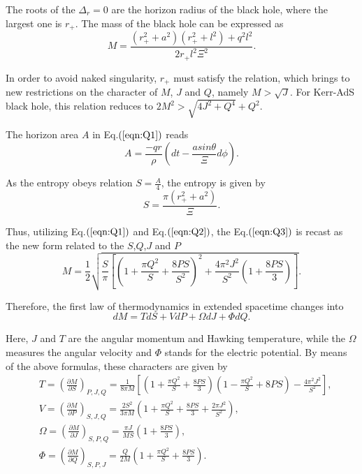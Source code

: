\documentclass[aps,preprint]{revtex4}%
\begin{document}
The roots of the $\Delta_{r}=0$ are the horizon radius of the black hole, where the largest one is $r_{+}$. The mass of the black hole can be expressed as
\begin{equation}\label{eqn:Q3}
M=\frac{(r_{+}^{2}+a^{2})(r_{+}^{2}+l^{2})+q^{2}l^{2}}{2r_{+}l^{2}\Xi^{2}}.
\end{equation}

 In order to avoid naked singularity, $r_{+}$ must satisfy the relation, which brings to new restrictions on the character of $M$, $J$ and $Q$, namely $M>\sqrt{J}$.
For Kerr-AdS black hole, this relation reduces to $2M^{2}>\sqrt{4J^{2}+Q^{4}}+Q^{2}$.

The horizon area $A$ in Eq.$\left(\ref{eqn:Q1}\right)$ reads
\begin{equation}\label{eqn:Q4}
A=\frac{-qr}{\rho}(dt-\frac{asin\theta}{\Xi}d\phi).
\end{equation}

As the entropy obeys relation $S=\frac{A}{4}$, the entropy is given by
\begin{equation}\label{eqn:Q5}
S=\frac{\pi(r_{+}^{2}+a^{2})}{\Xi}.
\end{equation}

Thus, utilizing Eq.$\left(\ref{eqn:Q1}\right)$ and Eq.$\left(\ref{eqn:Q2}\right)$, the Eq.$\left(\ref{eqn:Q3}\right)$ is recast as the new form related to the $S$,$Q$,$J$ and $P$
\begin{equation}\label{eqn:Q6}
M=\frac{1}{2}\sqrt{\frac{S}{\pi}[(1+\frac{\pi Q^{2}}{S}+\frac{8PS}{S^{2}})^{2}+\frac{4\pi^{2}J^{2}}{S^{2}}(1+\frac{8PS}{3})]}.
\end{equation}

Therefore, the first law of thermodynamics in extended spacetime changes into
\begin{equation}\label{eqn:Q32}
dM=TdS+VdP+\Omega dJ+\Phi dQ.
\end{equation}

Here, $J$ and $T$ are the angular momentum and Hawking temperature, while the $\Omega$
measures the angular velocity and $\Phi$ stands for the electric potential.
By means of the above formulas, these characters are given by
\begin{equation}\label{eqn:Q8}
\begin{aligned}
&T=(\frac{\partial M}{\partial S})_{P,J,Q}=\frac{1}{8\pi M}[(1+\frac{\pi Q^{2}}{S}+\frac{8PS}{3})(1-\frac{\pi Q^{2}}{S}+8PS)-\frac{4\pi^{2}J^{2}}{S^{2}}],\\
&V=(\frac{\partial M}{\partial P})_{S,J,Q}=\frac{2S^{2}}{3\pi M}(1+\frac{\pi Q^{2}}{S}+\frac{8PS}{3}+\frac{2\pi J^{2}}{S^{2}}),\\
&\Omega=(\frac{\partial M}{\partial J})_{S,P,Q}=\frac{\pi J}{MS}(1+\frac{8PS}{3}),\\
&\Phi=(\frac{\partial M}{\partial Q})_{S,P,J}=\frac{Q}{2M}(1+\frac{\pi Q^{2}}{S}+\frac{8PS}{3}).\\
\end{aligned}
\end{equation}
\end{document}
